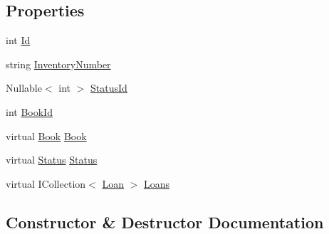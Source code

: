 \subsection*{Properties}
\begin{DoxyCompactItemize}
\item 
int \mbox{\hyperlink{class_easy_library_application_1_1_w_p_f_1_1_model_1_1_copy_ae6948a33385131144c653ea648d6f162}{Id}}
\item 
string \mbox{\hyperlink{class_easy_library_application_1_1_w_p_f_1_1_model_1_1_copy_a15dd9811bd0b80d86c779bd967ecfaf9}{Inventory\+Number}}
\item 
Nullable$<$ int $>$ \mbox{\hyperlink{class_easy_library_application_1_1_w_p_f_1_1_model_1_1_copy_ac9069415b4961274f0c34ec3705186eb}{Status\+Id}}
\item 
int \mbox{\hyperlink{class_easy_library_application_1_1_w_p_f_1_1_model_1_1_copy_a5e3ebe1826ee55eccfebd7904a89a062}{Book\+Id}}
\item 
virtual \mbox{\hyperlink{class_easy_library_application_1_1_w_p_f_1_1_model_1_1_book}{Book}} \mbox{\hyperlink{class_easy_library_application_1_1_w_p_f_1_1_model_1_1_copy_a029e4ecdca3fa9a11f762fcbd956dd85}{Book}}
\item 
virtual \mbox{\hyperlink{class_easy_library_application_1_1_w_p_f_1_1_model_1_1_status}{Status}} \mbox{\hyperlink{class_easy_library_application_1_1_w_p_f_1_1_model_1_1_copy_a168e52aa4d44edc4f076b7a8b25c2afd}{Status}}
\item 
virtual I\+Collection$<$ \mbox{\hyperlink{class_easy_library_application_1_1_w_p_f_1_1_model_1_1_loan}{Loan}} $>$ \mbox{\hyperlink{class_easy_library_application_1_1_w_p_f_1_1_model_1_1_copy_a02a2f63c6b877d8c0c62cd738b7e95cb}{Loans}}
\end{DoxyCompactItemize}


\subsection{Constructor \& Destructor Documentation}
\mbox{\label{class_easy_library_application_1_1_w_p_f_1_1_model_1_1_copy_ac94bd8695db27e1118a29b5905860fc1}} 
